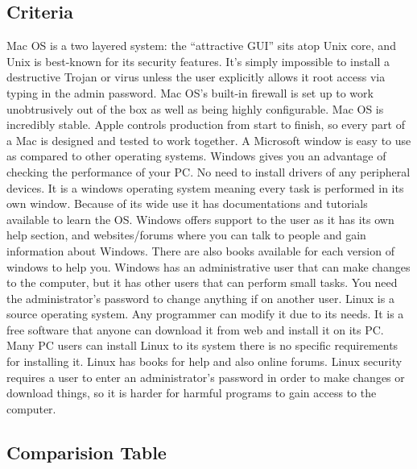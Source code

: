 \subsection{Criteria}
Mac OS is a two layered system: the “attractive GUI” sits atop Unix core, and Unix is best-known for its
security features. It’s simply impossible to install a destructive Trojan or virus unless the user explicitly
allows it root access via typing in the admin password. Mac OS’s built-in firewall is set up to work
unobtrusively out of the box as well as being highly configurable. Mac OS is incredibly stable. Apple
controls production from start to finish, so every part of a Mac is designed and tested to work together.
\newline
\newline
A Microsoft window is easy to use as compared to other operating systems. Windows gives you an
advantage of checking the performance of your PC. No need to install drivers of any peripheral devices.
It is a windows operating system meaning every task is performed in its own window. Because of its
wide use it has documentations and tutorials available to learn the OS. Windows offers support to the
user as it has its own help section, and websites/forums where you can talk to people and gain
information about Windows. There are also books available for each version of windows to help you.
Windows has an administrative user that can make changes to the computer, but it has other users that
can perform small tasks. You need the administrator’s password to change anything if on another user.
\newline
\newline
Linux is a source operating system. Any programmer can modify it due to its needs. It is a free software
that anyone can download it from web and install it on its PC. Many PC users can install Linux to its
system there is no specific requirements for installing it. Linux has books for help and also online forums.
Linux security requires a user to enter an administrator’s password in order to make changes or
download things, so it is harder for harmful programs to gain access to the computer.




\subsection{Comparision Table}

